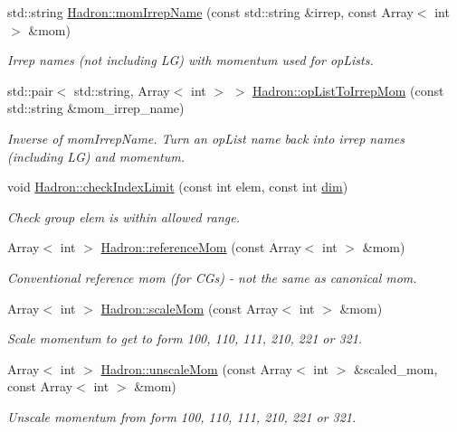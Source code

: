 \begin{DoxyCompactItemize}
std\+::string \mbox{\hyperlink{namespaceHadron_a5c4cac841f1c5a1f144e6c98360d8a4d}{Hadron\+::mom\+Irrep\+Name}} (const std\+::string \&irrep, const Array$<$ int $>$ \&mom)
\begin{DoxyCompactList}\small\item\em Irrep names (not including LG) with momentum used for op\+Lists. \end{DoxyCompactList}\item 
std\+::pair$<$ std\+::string, Array$<$ int $>$ $>$ \mbox{\hyperlink{namespaceHadron_a8bd515c92e3dbbe8e9741b25d71edc60}{Hadron\+::op\+List\+To\+Irrep\+Mom}} (const std\+::string \&mom\+\_\+irrep\+\_\+name)
\begin{DoxyCompactList}\small\item\em Inverse of mom\+Irrep\+Name. Turn an op\+List name back into irrep names (including LG) and momentum. \end{DoxyCompactList}\item 
void \mbox{\hyperlink{namespaceHadron_a32841ac341a167a00453d3846a386fd9}{Hadron\+::check\+Index\+Limit}} (const int elem, const int \mbox{\hyperlink{adat__devel_2lib_2hadron_2irrep__util_8cc_a70b5e28b5bc3d1b63a7435c5fe50b837}{dim}})
\begin{DoxyCompactList}\small\item\em Check group elem is within allowed range. \end{DoxyCompactList}\item 
Array$<$ int $>$ \mbox{\hyperlink{namespaceHadron_a8a4e39ac150585731d18fb970ec8a1bd}{Hadron\+::reference\+Mom}} (const Array$<$ int $>$ \&mom)
\begin{DoxyCompactList}\small\item\em Conventional reference mom (for C\+Gs) -\/ not the same as canonical mom. \end{DoxyCompactList}\item 
Array$<$ int $>$ \mbox{\hyperlink{namespaceHadron_ab3424b316e2a4d8e820c88f8027742e1}{Hadron\+::scale\+Mom}} (const Array$<$ int $>$ \&mom)
\begin{DoxyCompactList}\small\item\em Scale momentum to get to form 100, 110, 111, 210, 221 or 321. \end{DoxyCompactList}\item 
Array$<$ int $>$ \mbox{\hyperlink{namespaceHadron_ad5e2b22f66d2effe70db7f0ba129eae1}{Hadron\+::unscale\+Mom}} (const Array$<$ int $>$ \&scaled\+\_\+mom, const Array$<$ int $>$ \&mom)
\begin{DoxyCompactList}\small\item\em Unscale momentum from form 100, 110, 111, 210, 221 or 321. \end{DoxyCompactList}\item 

\end{DoxyCompactItemize}
